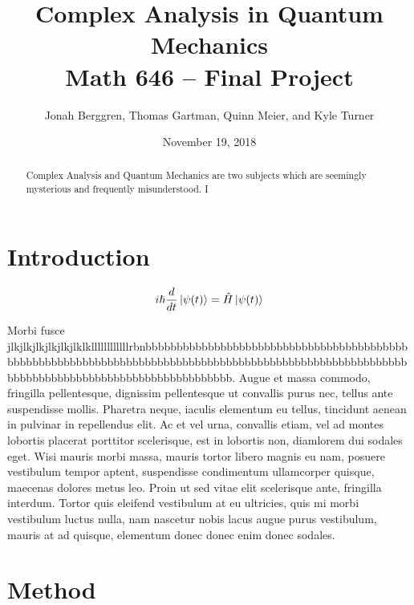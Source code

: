 \documentclass[12pt]{article}
\begin{document}
\title{Complex Analysis in Quantum Mechanics \\
Math 646 -- Final Project}
\author{Jonah Berggren, Thomas Gartman, Quinn Meier, and Kyle Turner}
\date{November 19, 2018}

\maketitle%

\begin{abstract}
Complex Analysis and Quantum Mechanics are two subjects which are seemingly mysterious and frequently misunderstood. I
\end{abstract}


\section{Introduction}%

\begin{equation}
i\hslash \frac{d}{dt} \ket{\psi(t)} = \Hat{H} \ket{\psi(t)}
\end{equation}


Morbi fusce jlkjlkjlkjlkjlkjlklkllllllllllllrbnbbbbbbbbbbbbbbbbbbbbbbbbbbbbbbbbbbbbbbbbbbbbbbbbbbbbbbbbbbbbbbbbbbbbbbbbbbbbbbbbbbbbbbbbbbbbbbbbbbbbbbbbbbbbbbbbbbbbbbbbbbbbbbbbbbbbbbbbbbbbbb.
Augue et massa commodo, fringilla pellentesque, dignissim pellentesque ut convallis purus nec, tellus ante suspendisse mollis. Pharetra neque, iaculis elementum eu tellus, tincidunt aenean in pulvinar in repellendus elit. Ac et vel urna, convallis etiam, vel ad montes lobortis placerat porttitor scelerisque, est in lobortis non, diamlorem dui sodales eget. Wisi mauris morbi massa, mauris tortor libero magnis eu nam, posuere vestibulum tempor aptent, suspendisse condimentum ullamcorper quisque, maecenas dolores metus leo. Proin ut sed vitae elit scelerisque ante, fringilla interdum. Tortor quis eleifend vestibulum at eu ultricies, quis mi morbi vestibulum luctus nulla, nam nascetur nobis lacus augue purus vestibulum, mauris at ad quisque, elementum donec donec enim donec sodales.

\section{Method}
\end{document}
